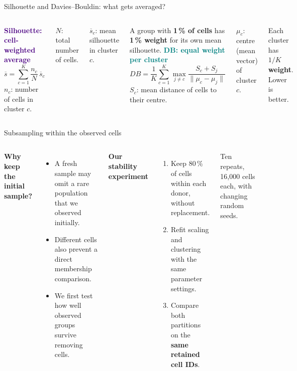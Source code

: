 \begin{frame}{Silhouette and Davies--Bouldin: what gets averaged?}
  \begin{columns}[T,onlytextwidth]
    \textcolor{Indigo}{\textbf{Silhouette: cell-weighted average}}
    \[\overline{s}=\sum_{c=1}^{K}\frac{n_c}{N}\,\overline{s}_c\]
    \small
    $n_c$: number of cells in cluster $c$.\par
    $N$: total number of cells.\par
    $\overline{s}_c$: mean silhouette in cluster $c$.\par
    \vspace{3mm}
    A group with \textbf{1\,\% of cells} has \textbf{1\,\% weight} for its own mean silhouette.
    \textcolor{Teal}{\textbf{DB: equal weight per cluster}}
    \[DB=\frac{1}{K}\sum_{c=1}^{K}\max_{j\ne c}
        \frac{S_c+S_j}{\lVert\mu_c-\mu_j\rVert}\]
    \small
    $S_c$: mean distance of cells to their centre.\par
    $\mu_c$: centre (mean vector) of cluster $c$.\par
    \vspace{7mm}
    Each cluster has \textbf{$1/K$ weight}. Lower is better.
  \end{columns}
\end{frame}

\begin{frame}{Subsampling within the observed cells}
  \begin{columns}[T,onlytextwidth]
    \textbf{Why keep the initial sample?}
    \begin{itemize}
      \item A fresh sample may omit a rare population that we observed initially.
      \item Different cells also prevent a direct membership comparison.
      \item We first test how well observed groups survive removing cells.
    \end{itemize}
    \textbf{Our stability experiment}
    \begin{enumerate}
      \item Keep 80\,\% of cells within each donor, without replacement.
      \item Refit scaling and clustering with the same parameter settings.
      \item Compare both partitions on the \textbf{same retained cell IDs}.
    \end{enumerate}
    \small Ten repeats, 16,000 cells each, with changing random seeds.
  \end{columns}
\end{frame}

